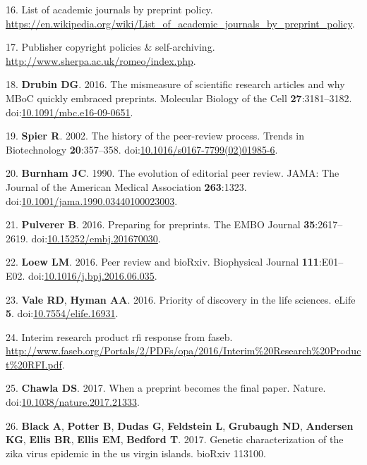 \documentclass[11pt,]{article}
\begin{document}
\hypertarget{ref-PreprintPolicy}{}
16. List of academic journals by preprint policy.
\url{https://en.wikipedia.org/wiki/List_of_academic_journals_by_preprint_policy}.

\hypertarget{ref-Sherpa}{}
17. Publisher copyright policies \& self-archiving.
\url{http://www.sherpa.ac.uk/romeo/index.php}.

\hypertarget{ref-Drubin2016}{}
18. \textbf{Drubin DG}. 2016. The mismeasure of scientific research
articles and why MBoC quickly embraced preprints. Molecular Biology of
the Cell \textbf{27}:3181--3182.
doi:\href{https://doi.org/10.1091/mbc.e16-09-0651}{10.1091/mbc.e16-09-0651}.

\hypertarget{ref-Spier2002}{}
19. \textbf{Spier R}. 2002. The history of the peer-review process.
Trends in Biotechnology \textbf{20}:357--358.
doi:\href{https://doi.org/10.1016/s0167-7799(02)01985-6}{10.1016/s0167-7799(02)01985-6}.

\hypertarget{ref-Burnham1990}{}
20. \textbf{Burnham JC}. 1990. The evolution of editorial peer review.
JAMA: The Journal of the American Medical Association \textbf{263}:1323.
doi:\href{https://doi.org/10.1001/jama.1990.03440100023003}{10.1001/jama.1990.03440100023003}.

\hypertarget{ref-Pulverer2016}{}
21. \textbf{Pulverer B}. 2016. Preparing for preprints. The EMBO Journal
\textbf{35}:2617--2619.
doi:\href{https://doi.org/10.15252/embj.201670030}{10.15252/embj.201670030}.

\hypertarget{ref-Loew2016}{}
22. \textbf{Loew LM}. 2016. Peer review and bioRxiv. Biophysical Journal
\textbf{111}:E01--E02.
doi:\href{https://doi.org/10.1016/j.bpj.2016.06.035}{10.1016/j.bpj.2016.06.035}.

\hypertarget{ref-Vale2016}{}
23. \textbf{Vale RD}, \textbf{Hyman AA}. 2016. Priority of discovery in
the life sciences. eLife \textbf{5}.
doi:\href{https://doi.org/10.7554/elife.16931}{10.7554/elife.16931}.

\hypertarget{ref-FASEB_letter}{}
24. Interim research product rfi response from faseb.
\url{http://www.faseb.org/Portals/2/PDFs/opa/2016/Interim\%20Research\%20Product\%20RFI.pdf}.

\hypertarget{ref-SinghChawla2017}{}
25. \textbf{Chawla DS}. 2017. When a preprint becomes the final paper.
Nature.
doi:\href{https://doi.org/10.1038/nature.2017.21333}{10.1038/nature.2017.21333}.

\hypertarget{ref-Black2017}{}
26. \textbf{Black A}, \textbf{Potter B}, \textbf{Dudas G},
\textbf{Feldstein L}, \textbf{Grubaugh ND}, \textbf{Andersen KG},
\textbf{Ellis BR}, \textbf{Ellis EM}, \textbf{Bedford T}. 2017. Genetic
characterization of the zika virus epidemic in the us virgin islands.
bioRxiv 113100.
\end{document}
